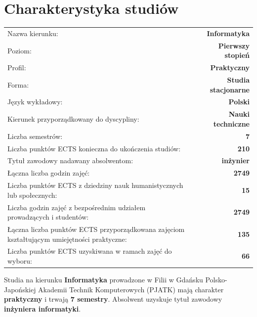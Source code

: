 \documentclass[12pt,a4paper]{article}
\renewcommand{\arraystretch}{1.35}
\begin{document}
\vspace{1cm}
\thispagestyle{empty}
\newpage
\setcounter{page}{1}

\tableofcontents
\newpage

\section{Charakterystyka studiów}

{\renewcommand{\arraystretch}{1.4}
\begin{tabularx}{\textwidth}{@{}Xr@{}}
\toprule
  {\small Nazwa kierunku:} & {\small\textbf{Informatyka}} \\
  {\small Poziom:} & {\small\textbf{Pierwszy stopień}} \\
  {\small Profil:} & {\small\textbf{Praktyczny}} \\
  {\small Forma:} & {\small\textbf{Studia stacjonarne}} \\
  {\small Język wykładowy:} & {\small\textbf{Polski}} \\
  {\small Kierunek przyporządkowany do dyscypliny:} & {\small\textbf{Nauki techniczne}} \\
\midrule
  {\small Liczba semestrów:} & {\small\textbf{7}} \\
  {\small Liczba punktów ECTS konieczna do ukończenia studiów:} & {\small\textbf{210}} \\
  {\small Tytuł zawodowy nadawany absolwentom:} & {\small\textbf{inżynier}} \\
\midrule
  {\small Łączna liczba godzin zajęć:} & {\small\textbf{2749}} \\
  {\small Liczba punktów ECTS z dziedziny nauk humanistycznych lub społecznych:} & {\small\textbf{15}} \\
  {\small Liczba godzin zajęć z bezpośrednim udziałem prowadzących i studentów:} & {\small\textbf{2749}} \\
  {\small Łączna liczba punktów ECTS przyporządkowana zajęciom kształtującym umiejętności praktyczne:} & {\small\textbf{135}} \\
  {\small Liczba punktów ECTS uzyskiwana w ramach zajęć do wyboru:} & {\small\textbf{66}} \\
\bottomrule
\end{tabularx}}

\bigskip


\newpage

Studia na kierunku \textbf{Informatyka} prowadzone w Filii w Gdańsku Polsko-Japońskiej Akademii Technik Komputerowych (PJATK) mają charakter \textbf{praktyczny} i trwają \textbf{7 semestry}. Absolwent uzyskuje tytuł zawodowy \textbf{inżyniera informatyki}.
\end{document}
